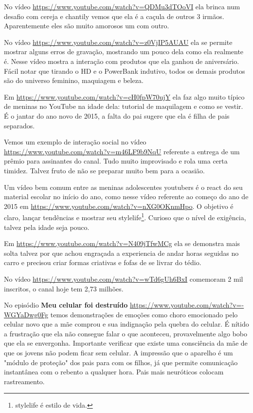 No vídeo \url{https://www.youtube.com/watch?v=QDMu3dTOoVI} ela brinca num desafio com cereja e chantily vemos que ela é a caçula de outros 3 irmãos. Aparentemente eles são muito amorosos um com outro.

No vídeo \url{https://www.youtube.com/watch?v=z0VjIP5AUAU} ela se permite mostrar alguns erros de gravação, mostrando um pouco dela como ela realmente é. Nesse vídeo mostra a interação com produtos que ela ganhou de aniversário. Fácil notar que tirando o HD e o PowerBank indutivo, todos os demais produtos são do universo feminino, maquiagem e beleza.



Em \url{https://www.youtube.com/watch?v=cH0fpW70ujY} ela faz algo muito típico de meninas no YouTube na idade dela: tutorial de maquilagem e como se vestir. É o jantar do ano novo de 2015, a falta do pai sugere que ela é filha de pais separados.

Vemos um exemplo de interação social no vídeo \url{https://www.youtube.com/watch?v=m46LF9b9NqU} referente a entrega de um prêmio para assinantes do canal. Tudo muito improvisado e rola uma certa timidez. Talvez fruto de não se preparar muito bem para a ocasião.

Um vídeo bem comum entre as meninas adolescentes youtubers é o react do seu material escolar no início do ano, como nesse vídeo referente ao começo do ano de 2015 em \url{https://www.youtube.com/watch?v=nXG0OKnmHpo}. O objetivo é claro, lançar tendências e mostrar seu stylelife\footnote{stylelife é estilo de vida.}. Curioso que o nível de exigência, talvez pela idade seja pouco.

Em \url{https://www.youtube.com/watch?v=N409jTfwMCg} ela se demonstra mais solta talvez por que achou engraçada a experiencia de andar horas seguidas no carro e precisou criar formas criativas e fofas de se livrar do tédio.

No vídeo \url{https://www.youtube.com/watch?v=wTd6gUh6BxI} comemoram 2 mil inscritos, o canal hoje tem 2,73 milhões.

No episódio \textbf{Meu celular foi destruído} \url{https://www.youtube.com/watch?v=-WGYaDwg0Fg} temos demonstrações de emoções como choro emocionado pelo celular novo que a mãe comprou e sua indignação pela quebra do celular. É nítido a frustração que ela não consegue falar o que aconteceu, provavelmente algo bobo que ela se envergonha. Importante verificar que existe uma consciência da mãe de que os jovens não podem ficar sem celular. A impressão que o aparelho é um "módulo de proteção" dos pais para com os filhos, já que permite comunicação instantânea com o rebento a qualquer hora. Pais mais neuróticos colocam rastreamento.

